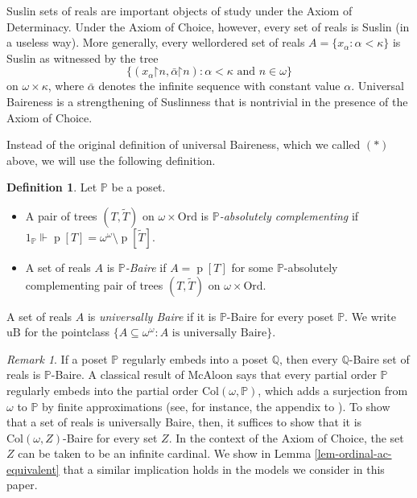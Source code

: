\documentclass[fleqn, 11pt]{amsart}
\theoremstyle{plain}
\theoremstyle{definition}
\newtheorem{defn}[thm]{Definition} \newtheorem*{defn*}{Definition}
\theoremstyle{remark}
\newtheorem{rem}[thm]{Remark} \newtheorem*{rem*}{Remark}
\newcommand{\Ord}{\mathrm{Ord}}
\newcommand{\forces}{\mathbin{\Vdash}}
\newcommand{\uB}{\mathrm{uB}}
\newcommand{\Col}{\mathrm{Col}}
\newcommand{\restrict}{\mathord{\restriction}}
\DeclareMathOperator{\p}{p}
\begin{document}
Suslin sets of reals are important objects of study under the Axiom of Determinacy.
Under the Axiom of Choice, however, every set of reals is Suslin (in a useless way).
More generally, every wellordered set of reals $A = \{x_\alpha : \alpha < \kappa\}$ is Suslin as witnessed by the tree \[\{(x_\alpha \restrict n, \bar{\alpha} \restrict n) : \alpha < \kappa \text{ and } n \in \omega\}\] on $\omega \times \kappa$, where $\bar{\alpha}$ denotes the infinite sequence with constant value $\alpha$. 
Universal Baireness is a strengthening of Suslinness that is nontrivial in the presence of the Axiom of Choice.

Instead of the original definition of universal Baireness, which we called $(\ast)$ above,
we will use the following definition. 




\begin{defn}\label{defn-uB}
Let $\mathbb{P}$ be a poset. 
\begin{itemize}
 \item A pair of trees $(T,\tilde{T})$ on $\omega \times \Ord$ is
 \emph{$\mathbb{P}$-absolutely complementing} if $1_{\mathbb{P}} \forces \p[T] = \omega^\omega\setminus \p[\tilde{T}]$.
 \item A set of reals $A$ is \emph{$\mathbb{P}$-Baire} if $A = \p[T]$ for some $\mathbb{P}$-absolutely complementing pair of trees $(T,\tilde{T})$ on $\omega \times \Ord$.
\end{itemize}
A set of reals $A$ is \emph{universally Baire} if it is $\mathbb{P}$-Baire for every poset $\mathbb{P}$. We write $\uB$ for the pointclass $\{A \subseteq \omega^\omega : A \text{ is universally Baire}\}$. 
\end{defn}

\begin{rem}\label{collapserem}
	If a poset $\mathbb{P}$ regularly embeds into a poset $\mathbb{Q}$, then every $\mathbb{Q}$-Baire set of reals is $\mathbb{P}$-Baire. A classical result of McAloon says that every partial order $\mathbb{P}$ regularly embeds into the partial order $\Col(\omega, \mathbb{P})$, which adds a surjection from $\omega$ to $\mathbb{P}$ by finite approximations (see, for instance, the appendix to \cite{LarStationaryTower}). To show that a set of reals is universally Baire, then, it suffices to show that it is $\Col(\omega, Z)$-Baire for every set $Z$. In the context of the Axiom of Choice, the set $Z$ can be taken to be an infinite cardinal. We show in Lemma \ref{lem-ordinal-ac-equivalent} that a similar implication holds in the models we consider in this paper. 
\end{rem}
\end{document}

